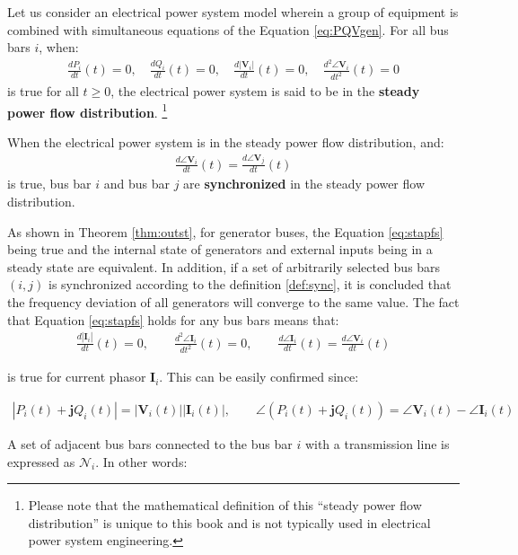 \documentclass[tombow,dvipdfmx]{corona-a5-1.1}
\begin{document}
\begin{定義}
\label{def:sync}
Let us consider an electrical power system model wherein a group of equipment is combined with simultaneous equations of the Equation \ref{eq:PQVgen}.
For all bus bars $i$, when:
\begin{align}\label{eq:stapfs}
\frac{dP_i}{dt}(t)=0
,\quad
\frac{dQ_i}{dt}(t)=0
,\quad
\frac{d|\bm{V}_i|}{dt}(t)=0
,\quad
\frac{d^2 \angle \bm{V}_i }{dt^2}(t)=0
\end{align}
is true for all $t\geq0$, the electrical power system is said to be in the \textbf{steady power flow distribution}.
\footnote{
Please note that the mathematical definition of this “steady power flow distribution” is unique to this book and is not typically used in electrical power system engineering.
}

When the electrical power system is in the steady power flow distribution, and:
\begin{align}\label{eq:defsyn}
\frac{d \angle \bm{V}_i}{dt}(t) =  \frac{d \angle \bm{V}_j}{dt}(t)
\end{align}
is true, bus bar $i$ and bus bar $j$ are \textbf{synchronized} in the steady power flow distribution.
\end{定義}

As shown in Theorem \ref{thm:outst}, for generator buses, the Equation \ref{eq:stapfs} being true and the internal state of generators and external inputs being in a steady state are equivalent.
In addition, if a set of arbitrarily selected bus bars $(i,j)$ is synchronized according to the definition \ref{def:sync}, it is concluded that the frequency deviation of all generators will converge to the same value.
The fact that Equation \ref{eq:stapfs} holds for any bus bars means that:
\begin{align*}
\frac{d|\bm{I}_i|}{dt}(t)=0
,\qquad
\frac{d^2 \angle \bm{I}_i }{dt^2}(t)=0
,\qquad
\frac{d \angle \bm{I}_i }{dt}(t) = \frac{d \angle \bm{V}_i }{dt} (t)
\end{align*}

is true for current phasor $\bm{I}_i$.
This can be easily confirmed since:

\begin{align*}
|P_i(t) + \bm{j} Q_i(t)| = |\bm{V}_i(t)| |\bm{I}_i(t)|
,\qquad
\angle(P_i(t) + \bm{j} Q_i(t)) = \angle \bm{V}_i(t) - \angle \bm{I}_i(t)
\end{align*}

A set of adjacent bus bars connected to the bus bar $i$ with a transmission line is expressed as $\mathcal{N}_i$. 
In other words:
\end{document}
